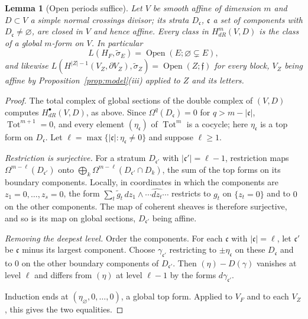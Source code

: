 \documentclass[11pt]{article}
\theoremstyle{plain}
\newtheorem{lemma}[prop]{Lemma}
\theoremstyle{definition}
\theoremstyle{remark}
\newcommand{\ff}{\mathfrak f}
\newcommand{\Open}{\operatorname{Open}}
\newcommand{\tsig}{\widetilde\sigma}
\begin{document}
\begin{lemma}[Open periods suffice]\label{lem:openall}
Let $V$ be smooth affine of dimension $m$ and $D\subset V$ a simple normal crossings divisor; its strata $D_{\mathfrak c}$, $\mathfrak c$ a set of components with $D_{\mathfrak c}\neq\varnothing$, are closed in $V$ and hence affine. Every class in $H^m_{dR}(V,D)$ is the class of a global $m$-form on $V$. In particular
\[
L(H_F,\tsig_E)=\Open(E;\varnothing\subsetneq E),
\]
and likewise $L(H^{|Z|-1}(V_Z,\partial V_Z),\tsig_Z)=\Open(Z;\ff)$ for every block, $V_Z$ being affine by Proposition~\ref{prop:model}(iii) applied to $Z$ and its letters.
\end{lemma}

\begin{proof}
The total complex of global sections of the double complex of $(V,D)$ computes $H^\bullet_{dR}(V,D)$, as above. Since $\Omega^q(D_{\mathfrak c})=0$ for $q>m-|\mathfrak c|$, $\operatorname{Tot}^{m+1}=0$, and every element $(\eta_{\mathfrak c})$ of $\operatorname{Tot}^m$ is a cocycle; here $\eta_{\mathfrak c}$ is a top form on $D_{\mathfrak c}$. Let $\ell=\max\{|\mathfrak c|:\eta_{\mathfrak c}\neq0\}$ and suppose $\ell\ge1$.

\emph{Restriction is surjective.} For a stratum $D_{\mathfrak c'}$ with $|\mathfrak c'|=\ell-1$, restriction maps $\Omega^{m-\ell}(D_{\mathfrak c'})$ onto $\bigoplus_k\Omega^{m-\ell}(D_{\mathfrak c'}\cap D_k)$, the sum of the top forms on its boundary components. Locally, in coordinates in which the components are $z_1=0,\dots,z_s=0$, the form $\sum_t\widetilde g_t\,dz_1\wedge\cdots\widehat{dz_t}\cdots$ restricts to $g_t$ on $\{z_t=0\}$ and to $0$ on the other components. The map of coherent sheaves is therefore surjective, and so is its map on global sections, $D_{\mathfrak c'}$ being affine.

\emph{Removing the deepest level.} Order the components. For each $\mathfrak c$ with $|\mathfrak c|=\ell$, let $\mathfrak c'$ be $\mathfrak c$ minus its largest component. Choose $\gamma_{\mathfrak c'}$ restricting to $\pm\eta_{\mathfrak c}$ on these $D_{\mathfrak c}$ and to $0$ on the other boundary components of $D_{\mathfrak c'}$. Then $(\eta)-D(\gamma)$ vanishes at level $\ell$ and differs from $(\eta)$ at level $\ell-1$ by the forms $d\gamma_{\mathfrak c'}$.

Induction ends at $(\eta_\varnothing,0,\dots,0)$, a global top form. Applied to $V_F$ and to each $V_Z$, this gives the two equalities.
\end{proof}
\end{document}
